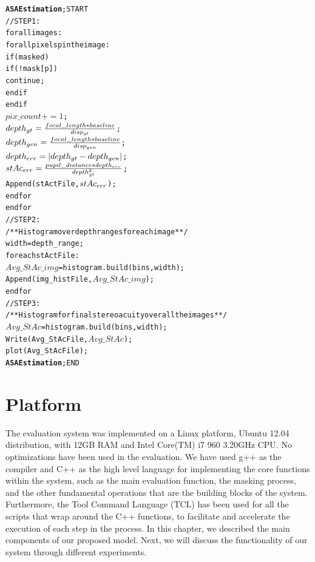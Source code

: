 \begin{alltt}
\textbf{ASA Estimation}; START
   // STEP1:
   for all images:
      for all pixels p in the image:
            if (masked)
               if(!mask[p]) 
                  continue;
               end if
            end if    
            \(pix\_count += 1\);
            \(depth\sb{gt} = \frac{focal\_length * baseline}{disp\sb{gt}}\);
            \(depth\sb{gen} = \frac{focal\_length * baseline}{disp\sb{gen}}\);
            \(depth\sb{err} = |depth\sb{gt}-depth\sb{gen}|\);
            \(stAc\sb{err} = \frac{pupil\_distance*depth\sb{err}}{depth\sb{gt}\sp{2}}\);
            Append(stActFile,\(stAc\sb{err}\));
      end for
   end for
   // STEP2:
   /**Histogram over depth ranges for each image**/
   width = depth\_range;
   for each stActFile:
      \(Avg\_StAc\_img\) = histogram.build(bins,width);
      Append(img\_histFile,\(Avg\_StAc\_img\));
   end for
   // STEP3:
   /**Histogram for final stereoacuity over all the images**/
   \(Avg\_StAc\) = histogram.build(bins,width);
   Write(Avg\_StAcFile,\(Avg\_StAc\));
   plot(Avg\_StAcFile);
\textbf{ASA Estimation}; END
\end{alltt}

\section{Platform}
The evaluation system was implemented on a Linux platform, Ubuntu 12.04 distribution, with 12GB RAM and Intel Core(TM) i7 960 3.20GHz CPU. No optimizations 
have been used in the evaluation. 
We have used g++ as the compiler and C++ as the high level language for implementing 
the core functions within the system, such as the main evaluation function, 
the masking process, and the other fundamental operations that are the building blocks of the system.
Furthermore, the Tool Command Language (TCL) has been used for all the scripts that wrap around the C++ functions,
to facilitate and accelerate the execution of each step in the process. \newline \newline
In this chapter, we described the main components of our proposed model. Next, we will discuss the functionality of our system through different experiments.
